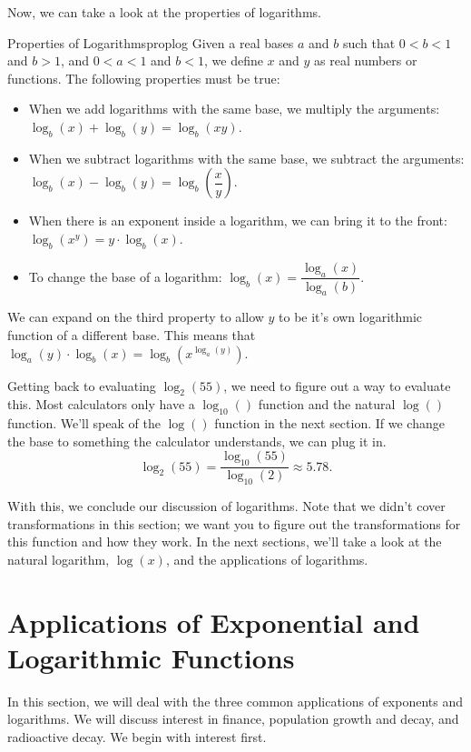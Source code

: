\documentclass[lang=en,11pt]{elegantbook}
\begin{document}
Now, we can take a look at the properties of logarithms.  
\begin{theorem}{Properties of Logarithms}{proplog}
Given a real bases $a$ and $b$ such that $0<b<1$ and $b>1$, and $0<a<1$ and $b<1$, we define $x$ and $y$ as real numbers or functions.  The following properties must be true: \begin{itemize}
    \item When we add logarithms with the same base, we multiply the arguments: $\log_b(x)+\log_b(y)=\log_b(xy)$.
    \item When we subtract logarithms with the same base, we subtract the arguments: $\log_b(x)-\log_b(y)=\log_b\left(\dfrac{x}{y}\right)$.
    \item When there is an exponent inside a logarithm, we can bring it to the front: $\log_b(x^y)=y\cdot \log_b(x)$.
    \item To change the base of a logarithm: $\log_b(x)=\dfrac{\log_a(x)}{\log_a(b)}$.
\end{itemize}
\end{theorem}
\begin{remark}
We can expand on the third property to allow $y$ to be it's own logarithmic function of a different base.  This means that $\log_a(y)\cdot \log_b(x)=\log_b\left(x^{\log_a(y)}\right)$.
\end{remark}

Getting back to evaluating $\log_2(55)$, we need to figure out a way to evaluate this.  Most calculators only have a $\log_{10}()$ function and the natural $\log()$ function.  We'll speak of the $\log()$ function in the next section.  If we change the base to something the calculator understands, we can plug it in.  $$\log_2(55)=\dfrac{\log_{10}(55)}{\log_{10}(2)}\approx 5.78.$$

With this, we conclude our discussion of logarithms.  Note that we didn't cover transformations in this section; we want you to figure out the transformations for this function and how they work.  In the next sections, we'll take a look at the natural logarithm, $\log(x)$, and the applications of logarithms.  
\section{Applications of Exponential and Logarithmic Functions}
\noindent In this section, we will deal with the three common applications of exponents and logarithms.  We will discuss interest in finance, population growth and decay, and radioactive decay.  We begin with interest first.
\end{document}
